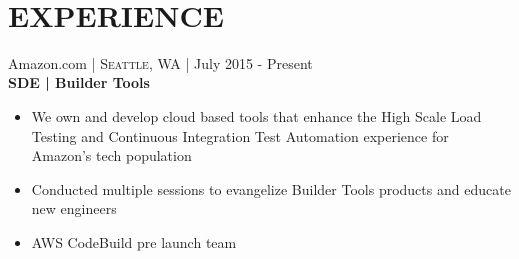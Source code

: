 \documentclass[10pt]{article} %
\begin{document}
\color{text1} %


\par{\\ %
	

\begin{minipage}[t]{0.57\textwidth} %
\vspace{0pt} %
	

\section{\uppercase{\textbf{Experience}}}



{\raggedright\large Amazon.com \normalsize\textsc{ | Seattle, WA} | July 2015 - Present \\
\textbf{SDE | Builder Tools}\\[5pt]}
\vspace{0pt}
\begin{itemize}\itemsep-0.25em
    \item We own and develop cloud based tools that enhance the High Scale Load Testing and Continuous Integration Test Automation experience for Amazon's tech population
    \item Conducted multiple sessions to evangelize Builder Tools products and educate new engineers
    \item AWS CodeBuild pre launch team
\end{itemize}\\


\end{minipage}}
\end{document}
